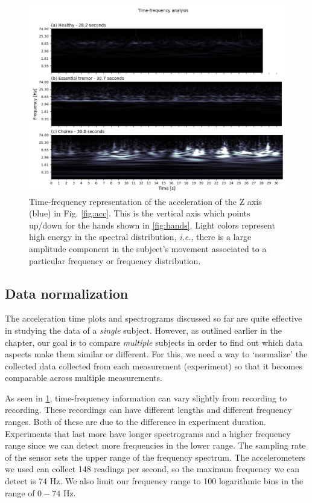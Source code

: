 
\begin{figure}[ht]
\centering
\includegraphics[width=\linewidth]{figures/nemo/freq2.png}
\caption{Time-frequency representation of the acceleration of the Z axis (blue) in Fig. \ref{fig:acc}. This is the vertical axis which points up/down for the hands shown in \cref{fig:hands}. Light colors represent high energy in the spectral distribution, \emph{i.e.}, there is a large amplitude component in the subject's movement associated to a particular frequency or frequency distribution. 
}
\label{fig:freq}
\end{figure}

\subsection{Data normalization}
\label{sec:nemo_pipeline_datanorm}
%
The acceleration time plots and spectrograms discussed so far are quite effective in studying the data of a \emph{single} subject. However, as outlined earlier in the chapter, our goal is to compare \emph{multiple} subjects in order to find out which data aspects make them similar or different. For this, we need a way to `normalize' the collected data collected from each measurement (experiment) so that it becomes comparable across multiple measurements.

As seen in \cref{fig:freq}, time-frequency information can vary slightly from recording to recording. These recordings can have different lengths and different frequency ranges. Both of these are due to the difference in experiment duration. Experiments that last more have longer spectrograms and a higher frequency range since we can detect more frequencies in the lower range. The sampling rate of the sensor sets the upper range of the frequency spectrum. The accelerometers we used can collect 148 readings per second, so the maximum frequency we can detect is 74 Hz. We also limit our frequency range to 100 logarithmic bins in the range of $0-74$ Hz. 

